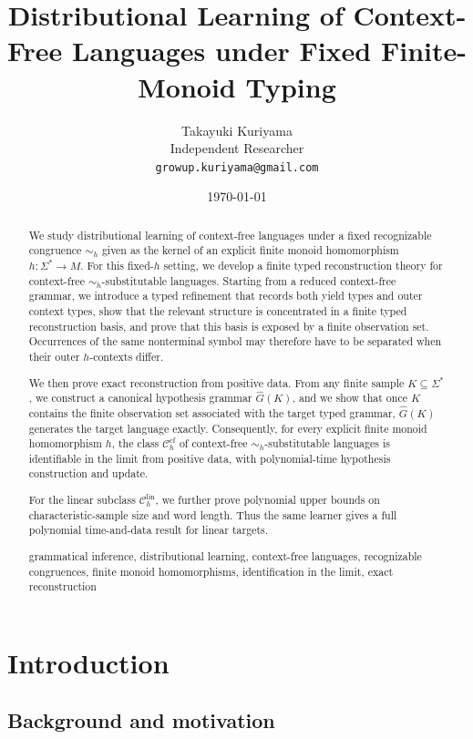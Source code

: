\documentclass[11pt,a4paper]{article}
\title{Distributional Learning of Context-Free Languages under Fixed Finite-Monoid Typing}
\author{Takayuki Kuriyama\\
Independent Researcher\\
\texttt{growup.kuriyama@gmail.com}}
\date{\today}
\newcommand{\keywords}[1]{\smallskip\noindent{\bfseries keywords:} #1}
\begin{document}
\maketitle

\begin{abstract}
We study distributional learning of context-free languages under a fixed recognizable congruence $\sim_h$ given as the kernel of an explicit finite monoid homomorphism $h:\Sigma^*\to M$. For this fixed-$h$ setting, we develop a finite typed reconstruction theory for context-free $\sim_h$-substitutable languages. Starting from a reduced context-free grammar, we introduce a typed refinement that records both yield types and outer context types, show that the relevant structure is concentrated in a finite typed reconstruction basis, and prove that this basis is exposed by a finite observation set. Occurrences of the same nonterminal symbol may therefore have to be separated when their outer $h$-contexts differ.

We then prove exact reconstruction from positive data. From any finite sample $K\subseteq\Sigma^*$, we construct a canonical hypothesis grammar $\hat G(K)$, and we show that once $K$ contains the finite observation set associated with the target typed grammar, $\hat G(K)$ generates the target language exactly. Consequently, for every explicit finite monoid homomorphism $h$, the class $\mathcal C_h^{\mathrm{cf}}$ of context-free $\sim_h$-substitutable languages is identifiable in the limit from positive data, with polynomial-time hypothesis construction and update.

For the linear subclass $\mathcal C_h^{\mathrm{lin}}$, we further prove polynomial upper bounds on characteristic-sample size and word length. Thus the same learner gives a full polynomial time-and-data result for linear targets.

\keywords{grammatical inference, distributional learning, context-free languages, recognizable congruences, finite monoid homomorphisms, identification in the limit, exact reconstruction}
\end{abstract}

\section{Introduction}
\label{sec:intro}

\subsection{Background and motivation}
\end{document}
